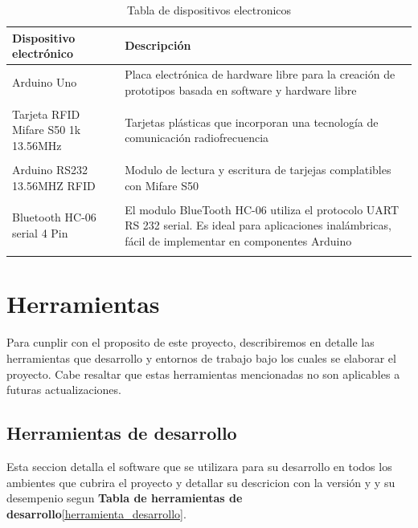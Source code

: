 \documentclass[letter,12pt]{article}
\begin{document}
\begin{table}
	\centering
	\begin{tabularx}{15cm}{X|X}
	Dispositivo electr\'onico 					& Descripci\'on									\\ 
	\hline
	Arduino Uno 								& Placa electr\'onica de hardware libre 
												  para la creaci\'on de prototipos basada en 
												  software y hardware libre                     \\
												& \\  
	Tarjeta RFID Mifare S50 1k 13.56MHz         & Tarjetas plásticas que incorporan una 
												  tecnología de comunicaci\'on radiofrecuencia  \\
												& \\
	Arduino RS232 13.56MHZ RFID 				& Modulo de lectura y escritura de
												  tarjejas complatibles con Mifare S50  		\\
												& \\												
	Bluetooth HC-06 serial 4 Pin 				& El modulo BlueTooth HC-06 utiliza el protocolo 
												  UART RS 232 serial. Es ideal para 
												  aplicaciones inal\'ambricas, f\'acil de  
												  implementar en componentes Arduino			\\
												& \\
	\end{tabularx} 
	\caption{Tabla de dispositivos electronicos}		
\end{table}	

\section{Herramientas}
Para cunplir con el proposito de este proyecto, describiremos en detalle las herramientas que desarrollo y entornos de trabajo bajo los cuales se 			elaborar el proyecto. Cabe resaltar que estas herramientas mencionadas no son aplicables a futuras actualizaciones.
	
	\subsection{Herramientas de desarrollo}
	
	Esta seccion detalla el software que se utilizara para su desarrollo en todos los ambientes que cubrira el proyecto y detallar su descricion con la versi\'on y y su desempenio segun \textbf{Tabla de herramientas de desarrollo}\ref{herramienta_desarrollo}.
	
\end{document}
